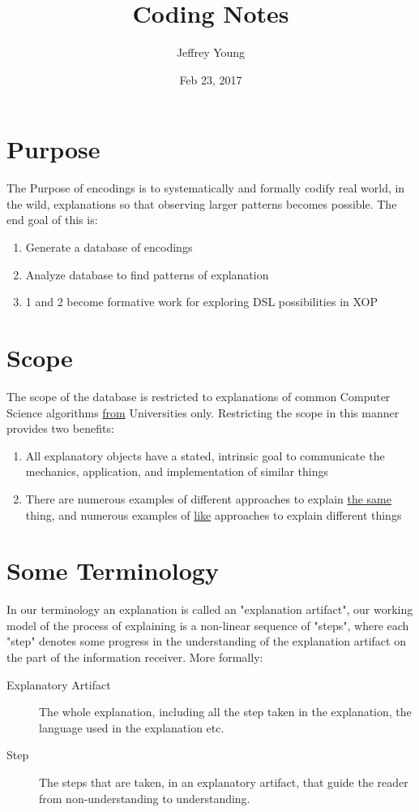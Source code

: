 \documentclass[10pt, letterpaper]{article}
\author{Jeffrey Young}
\date{Feb 23, 2017}
\title{Coding Notes}
\begin{document}
\maketitle

\section*{Purpose}
\label{sec:org4e0034f}
The Purpose of encodings is to systematically and formally codify real world, in the wild, explanations so that observing larger patterns becomes possible. The end goal of this is:
\begin{enumerate}
\item Generate a database of encodings
\item Analyze database to find patterns of explanation
\item 1 and 2 become formative work for exploring DSL possibilities in XOP
\end{enumerate}
\section*{Scope}
\label{sec:org0d4f588}
The scope of the database is restricted to explanations of common Computer Science algorithms \uline{from} Universities only. Restricting the scope in this manner provides two benefits:
\begin{enumerate}
\item All explanatory objects have a stated, intrinsic goal to communicate the mechanics, application, and implementation of similar things
\item There are numerous examples of different approaches to explain \uline{the same} thing, and numerous examples of \uline{like} approaches to explain different things
\end{enumerate}

\section*{Some Terminology}
\label{sec:orgbe0d9dc}
In our terminology an explanation is called an "explanation artifact", our
  working model of the process of explaining is a non-linear sequence of
  "steps", where each "step" denotes some progress in the understanding of the
  explanation artifact on the part of the information receiver. More formally:
\begin{description}
\item[{Explanatory Artifact}] The whole explanation, including all the step taken in the explanation, the language used in the explanation etc.
\item[{Step}] The steps that are taken, in an explanatory artifact, that guide the
reader from non-understanding to understanding.
\end{description}
\end{document}
